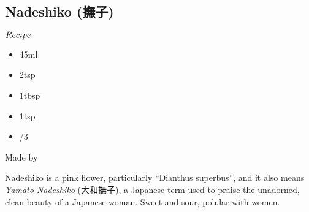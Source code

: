 \subsection{Nadeshiko (撫子)}
\begin{itembox}[l]{\boldmath $Recipe$}
\begin{itemize}
\setlength{\parskip}{0cm}
\setlength{\itemsep}{0cm}
\item \sake 45ml
\item \gs 2tsp
\item \lj 1tbsp
\item \gumsyrup 1tsp
\item {}/3
\end{itemize}
\vspace{-4mm}
Made by \shake
\end{itembox}
Nadeshiko is a pink flower, particularly ``Dianthus superbus'', and it also means {\it Yamato Nadeshiko} (大和撫子), a Japanese term used to praise the unadorned, clean beauty of a Japanese woman. Sweet and sour, polular with women.
